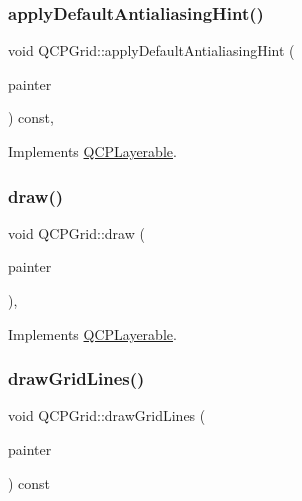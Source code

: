\subsubsection{\texorpdfstring{apply\+Default\+Antialiasing\+Hint()}{applyDefaultAntialiasingHint()}}
{\footnotesize\ttfamily void Q\+C\+P\+Grid\+::apply\+Default\+Antialiasing\+Hint (\begin{DoxyParamCaption}\item[{\hyperlink{class_q_c_p_painter}{Q\+C\+P\+Painter} $\ast$}]{painter }\end{DoxyParamCaption}) const\hspace{0.3cm}{\ttfamily [protected]}, {\ttfamily [virtual]}}



Implements \hyperlink{class_q_c_p_layerable_afdf83ddc6a265cbf4c89fe99d3d93473}{Q\+C\+P\+Layerable}.

\mbox{\label{class_q_c_p_grid_aad9a312d998e2d170956334d4cb80be2}} 
\subsubsection{\texorpdfstring{draw()}{draw()}}
{\footnotesize\ttfamily void Q\+C\+P\+Grid\+::draw (\begin{DoxyParamCaption}\item[{\hyperlink{class_q_c_p_painter}{Q\+C\+P\+Painter} $\ast$}]{painter }\end{DoxyParamCaption})\hspace{0.3cm}{\ttfamily [protected]}, {\ttfamily [virtual]}}



Implements \hyperlink{class_q_c_p_layerable_aecf2f7087482d4b6a78cb2770e5ed12d}{Q\+C\+P\+Layerable}.

\mbox{\label{class_q_c_p_grid_aee4e95d54acabbe298d6dda0dd86c0a4}} 
\subsubsection{\texorpdfstring{draw\+Grid\+Lines()}{drawGridLines()}}
{\footnotesize\ttfamily void Q\+C\+P\+Grid\+::draw\+Grid\+Lines (\begin{DoxyParamCaption}\item[{\hyperlink{class_q_c_p_painter}{Q\+C\+P\+Painter} $\ast$}]{painter }\end{DoxyParamCaption}) const\hspace{0.3cm}{\ttfamily [protected]}}

